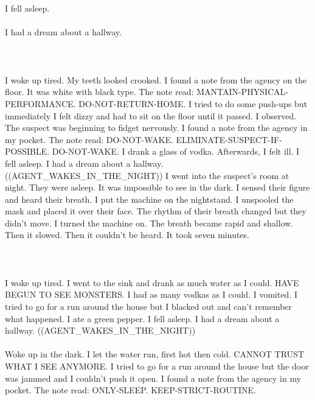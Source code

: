 \documentclass{article}
\begin{document}
    \section{}
    I fell asleep.\\\\I had a dream about a hallway.\\\\ 
    \newpage
    
    \section{}
    I woke up tired. My teeth looked crooked. I found a note from the agency on the floor. It was white with black type. The note read: MANTAIN-PHYSICAL-PERFORMANCE. DO-NOT-RETURN-HOME. I tried to do some push-ups but immediately I felt dizzy and had to sit on the floor until it passed. I observed. The suspect was beginning to fidget nervously. I found a note from the agency in my pocket. The note read: DO-NOT-WAKE. ELIMINATE-SUSPECT-IF-POSSIBLE. DO-NOT-WAKE. I drank a glass of vodka. Afterwards, I felt ill. I fell asleep. I had a dream about a hallway. ((AGENT_WAKES_IN_THE_NIGHT)) I went into the suspect's room at night. They were asleep. It was impossible to see in the dark. I sensed their figure and heard their breath. I put the machine on the nightstand. I unspooled the mask and placed it over their face. The rhythm of their breath changed but they didn't move. I turned the machine on. The breath became rapid and shallow. Then it slowed. Then it couldn't be heard. It took seven minutes. \\\\
    \newpage
    
    \section{}
    I woke up tired. I went to the sink and drank as much water as I could. HAVE BEGUN TO SEE MONSTERS. I had as many vodkas as I could. I vomited. I tried to go for a run around the house but I blacked out and can't remember what happened. I ate a green pepper. I fell asleep. I had a dream about a hallway. ((AGENT_WAKES_IN_THE_NIGHT)) \\\\Woke up in the dark. I let the water run, first hot then cold. CANNOT TRUST WHAT I SEE ANYMORE. I tried to go for a run around the house but the door was jammed and I couldn't push it open. I found a note from the agency in my pocket. The note read: ONLY-SLEEP. KEEP-STRICT-ROUTINE. \\\\
    \newpage
    
\end{document}
